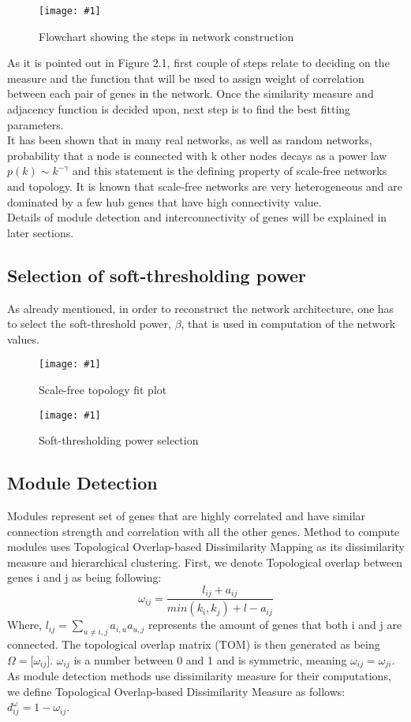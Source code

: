 \documentclass{ba-kecs}
\numberwithin{figure}{section}
\numberwithin{equation}{section}
\newcommand{\dkepic}[2]{ %
	\begin{figure}[H] %
	\texttt{[image: \#1]}
	\caption{#2}
	\label{#1}
	\end{figure}
}
\begin{document}
\dkepic{FlowChart}{Flowchart showing the steps in network construction}

As it is pointed out in Figure 2.1, first couple of steps relate to deciding on the measure and the function that will be used to assign weight of correlation between each pair of genes in the network. Once the similarity measure and adjacency function is decided upon, next step is to find the best fitting parameters. \\
It has been shown that in many real networks, as well as random networks, probability that a node is connected with k other nodes decays as a power law $ p(k) \sim k ^{-\gamma}$ and this statement is the defining property of scale-free networks and topology. It is known that scale-free networks are very heterogeneous and are dominated by a few hub genes that have high connectivity value. \\

Details of module detection and interconnectivity of genes will be explained in later sections.


\subsection{Selection of soft-thresholding power}
As already mentioned, in order to reconstruct the network architecture, one has to select the soft-threshold power, $\beta$, that is used in computation of the network values\cite{wgcna3}.
\dkepic{R2}{Scale-free topology fit plot}

\dkepic{power}{Soft-thresholding power selection}

\subsection{Module Detection}
Modules represent set of genes that are highly correlated and have similar connection strength and correlation with all the other genes. Method to compute modules uses Topological Overlap-based Dissimilarity Mapping as its dissimilarity measure and hierarchical clustering. First, we denote Topological overlap between genes i and j as being following:\\
\begin{equation}
\omega _{ij} = \dfrac{l _{ij} + a_{ij}}{min(k_i,k_j) + l - a_{ij}}
\end{equation}
Where, $l_{ij} = \sum_{u \neq {i,j}} a_{i,u} a_{u,j}$ represents the amount of genes that both i and j are connected. The topological overlap matrix (TOM) is then generated as being $\Omega = \lbrack \omega _{ij} \rbrack$. $\omega _{ij}$ is a number between 0 and 1 and is symmetric, meaning $\omega _{ij} = \omega _{ji}$. As module detection methods use dissimilarity measure for their computations, we define Topological Overlap-based Dissimilarity Measure as follows: $d _{ij} ^{\omega} = 1 - \omega _{ij}$.
\end{document}
